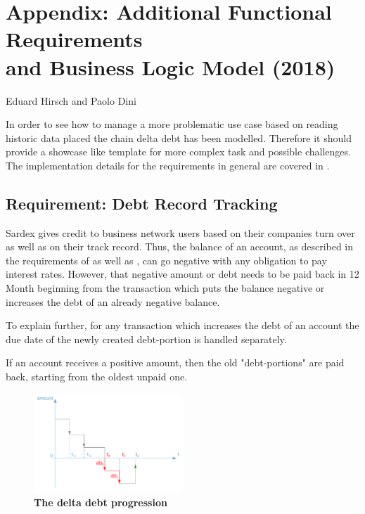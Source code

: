 \chapter*{Appendix: Additional Functional Requirements\\ and Business Logic Model (2018)}
\label{appendix}

\vspace{-1cm}
\begin{center}
Eduard Hirsch and Paolo Dini
\end{center}

In order to see how to manage a more problematic use case based on reading historic data placed the chain delta debt has been modelled. Therefore it should provide a showcase like template for more complex task and possible challenges. The implementation details for the requirements in general are covered in \cite{INTERLACE_D32}.

\section{Requirement: Debt Record Tracking}

Sardex gives credit to business network users based on their companies turn over as well as on their track record. Thus, the balance of an account, as described in the requirements of \cite{INTERLACE_D21} as well as \cite{INTERLACE_D31}, can go negative with any obligation to pay interest rates. However, that negative amount or debt needs to be paid back in 12 Month beginning from the transaction which puts the balance negative or increases the debt of an already negative balance.

To explain further, for any transaction which increases the debt of an account the due date of the newly created debt-portion is handled separately.

If an account receives a positive amount, then the old "debt-portions" are paid back, starting from the oldest unpaid one.

\begin{figure}[htbp]
  \centering
  \includegraphics[width=0.5\textwidth, clip, trim=1mm 1mm 1mm 1mm]{Figures/deltadebt}
  \caption{\bf\small The delta debt progression}
  \label{fig:debt-graph}
\end{figure}

